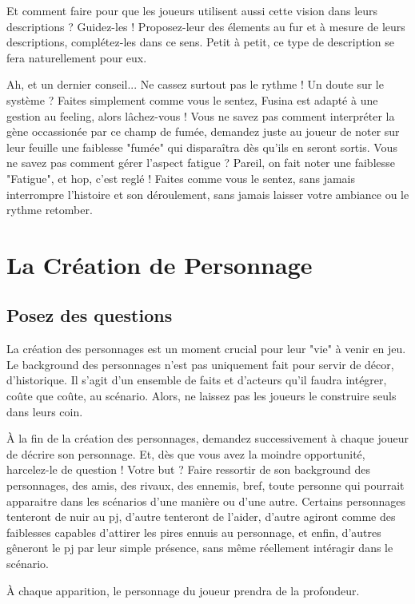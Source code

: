 Et comment faire pour que les joueurs utilisent aussi cette vision dans leurs descriptions ? Guidez-les ! Proposez-leur des élements au fur et à mesure de leurs descriptions, complétez-les dans ce sens. Petit à petit, ce type de description se fera naturellement pour eux. 

Ah, et un dernier conseil... Ne cassez surtout pas le rythme ! Un doute sur le système ? Faites simplement comme vous le sentez, Fusina est adapté à une gestion au feeling, alors lâchez-vous ! Vous ne savez pas comment interpréter la gène occassionée par ce champ de fumée, demandez juste au joueur de noter sur leur feuille une faiblesse "fumée" qui disparaîtra dès qu'ils en seront sortis. Vous ne savez pas comment gérer l'aspect fatigue ? Pareil, on fait noter une faiblesse "Fatigue", et hop, c'est reglé ! Faites comme vous le sentez, sans jamais interrompre l'histoire et son déroulement, sans jamais laisser votre ambiance ou le rythme retomber.

\chapter{La Création de Personnage}

\section{Posez des questions}

La création des personnages est un moment crucial pour leur "vie" à venir en jeu. Le background des personnages n'est pas uniquement fait pour servir de décor, d'historique. Il s'agit d'un ensemble de faits et d'acteurs qu'il faudra intégrer, coûte que coûte, au scénario. Alors, ne laissez pas les joueurs le construire seuls dans leurs coin.

À la fin de la création des personnages, demandez successivement à chaque joueur de décrire son personnage. Et, dès que vous avez la moindre opportunité, harcelez-le de question ! Votre but ? Faire ressortir de son background des personnages, des amis, des rivaux, des ennemis, bref, toute personne qui pourrait apparaitre dans les scénarios d'une manière ou d'une autre. Certains personnages tenteront de nuir au pj, d'autre tenteront de l'aider, d'autre agiront comme des faiblesses capables d'attirer les pires ennuis au personnage, et enfin, d'autres gêneront le pj par leur simple présence, sans même réellement intéragir dans le scénario. 

À chaque apparition, le personnage du joueur prendra de la profondeur.

